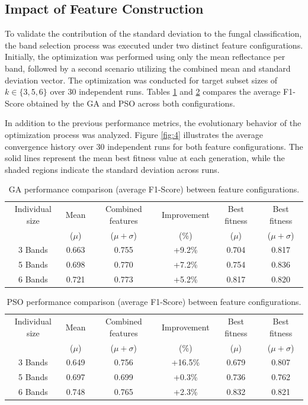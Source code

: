 \documentclass[runningheads]{llncs}
\begin{document}
\subsection{Impact of Feature Construction}
To validate the contribution of the standard deviation to the fungal classification, the band selection process was executed under two distinct feature configurations. 
Initially, the optimization was performed using only the mean reflectance per band, followed by a second scenario utilizing the combined mean and standard deviation vector. 
The optimization was conducted for target subset sizes of $k\in\{3,5,6\}$ over 30 independent runs. 
Tables \ref{tab4} and \ref{tab5} compares the average F1-Score obtained by the GA and PSO across both configurations.

In addition to the previous performance metrics, the evolutionary behavior of the optimization process was analyzed.
Figure \ref{fig:4} illustrates the average convergence history over 30 independent runs for both feature configurations. 
The solid lines represent the mean best fitness value at each generation, while the shaded regions indicate the standard deviation across runs.
\begin{table}
    \centering
    \caption{GA performance comparison (average F1-Score) between feature configurations.\label{tab4}}
    \begin{tabular}{c|c|c|c|c|c}
        \hline
        Individual size & Mean & Combined features & Improvement & Best fitness & Best fitness\\
         & ($\mu$) & ($\mu + \sigma$) & (\%) & ($\mu$) & ($\mu + \sigma$)\\
        \hline
        3 Bands & 0.663 & 0.755 & +9.2\% & 0.704 & 0.817\\
        5 Bands & 0.698 & 0.770 & +7.2\% & 0.754 & 0.836\\
        6 Bands & 0.721 & 0.773 & +5.2\% & 0.817 & 0.820\\
        \hline
    \end{tabular}
\end{table}

\begin{table}
    \centering
    \caption{PSO performance comparison (average F1-Score) between feature configurations.\label{tab5}}
    \begin{tabular}{c|c|c|c|c|c}
        \hline
        Individual size & Mean & Combined features & Improvement & Best fitness & Best fitness\\
         & ($\mu$) & ($\mu + \sigma$) & (\%) & ($\mu$) & ($\mu + \sigma$)\\
        \hline
        3 Bands & 0.649 & 0.756 & +16.5\% & 0.679 & 0.807\\
        5 Bands & 0.697 & 0.699 & +0.3\% & 0.736 & 0.762\\
        6 Bands & 0.748 & 0.765 & +2.3\% & 0.832 & 0.821\\
        \hline
    \end{tabular}
\end{table}
\end{document}
